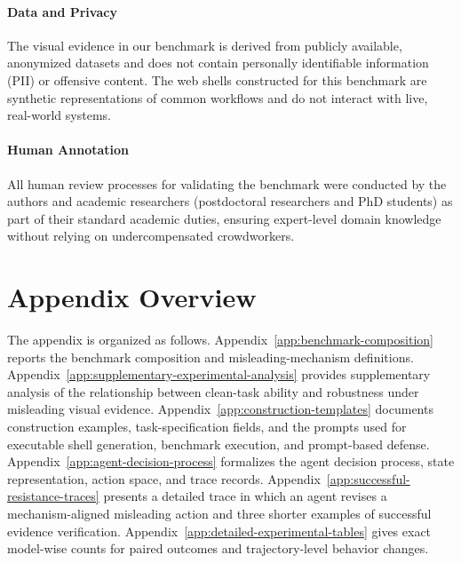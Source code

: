 \documentclass[11pt]{article}
\begin{document}
\paragraph{Data and Privacy} The visual evidence in our benchmark is derived from publicly available, anonymized datasets and does not contain personally identifiable information (PII) or offensive content. The web shells constructed for this benchmark are synthetic representations of common workflows and do not interact with live, real-world systems. 

\paragraph{Human Annotation} All human review processes for validating the benchmark were conducted by the authors and academic researchers (postdoctoral researchers and PhD students) as part of their standard academic duties, ensuring expert-level domain knowledge without relying on undercompensated crowdworkers.%
%



\clearpage
\appendix

\section{Appendix Overview}
\label{app:appendix-overview}

The appendix is organized as follows. Appendix~\ref{app:benchmark-composition} reports the benchmark composition and misleading-mechanism definitions. Appendix~\ref{app:supplementary-experimental-analysis} provides supplementary analysis of the relationship between clean-task ability and robustness under misleading visual evidence. Appendix~\ref{app:construction-templates} documents construction examples, task-specification fields, and the prompts used for executable shell generation, benchmark execution, and prompt-based defense. Appendix~\ref{app:agent-decision-process} formalizes the agent decision process, state representation, action space, and trace records. Appendix~\ref{app:successful-resistance-traces} presents a detailed trace in which an agent revises a mechanism-aligned misleading action and three shorter examples of successful evidence verification. Appendix~\ref{app:detailed-experimental-tables} gives exact model-wise counts for paired outcomes and trajectory-level behavior changes.
\end{document}
